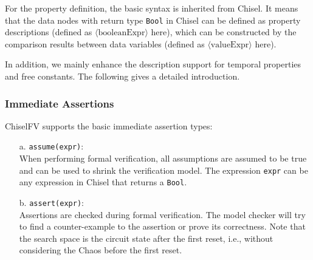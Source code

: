 \documentclass[conference]{IEEEtran}
\theoremstyle{definition}
\begin{document}
For the property definition, the basic syntax is inherited from Chisel. It means that the data nodes with return type \verb|Bool| in Chisel can be defined as property descriptions (defined as $\langle \text{booleanExpr} \rangle$ here), which can be constructed by the comparison results between data variables (defined as $\langle \text{valueExpr} \rangle$ here).

In addition, we mainly enhance the description support for temporal properties and free constants. The following gives a detailed introduction.

\subsubsection{Immediate Assertions}
ChiselFV supports the basic immediate assertion types:
\begin{itemize}
  \item[a.] \verb|assume(expr)|: \\ When performing formal verification, all assumptions are assumed to be true and can be used to shrink the verification model. The expression \verb|expr| can be any expression in Chisel that returns a \verb|Bool|.
  \item[b.] \verb|assert(expr)|: \\ Assertions are checked during formal verification. The model checker will try to find a counter-example to the assertion or prove its correctness. Note that the search space is the circuit state after the first reset, i.e., without considering the Chaos before the first reset.
\end{itemize}

\end{document}
